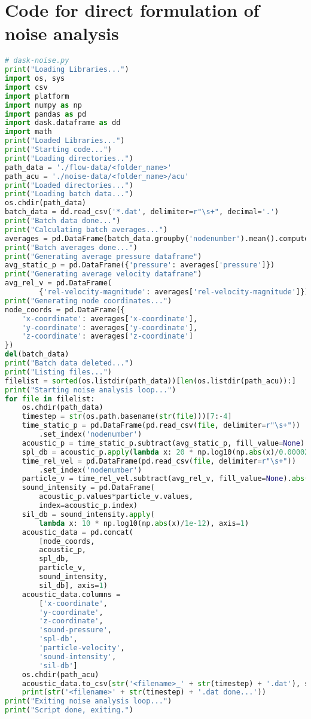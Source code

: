 \chapter{Code for direct formulation of noise analysis} %

\label{codedirect} %


\begin{lstlisting}[language=Python]
# dask-noise.py
print("Loading Libraries...")
import os, sys
import csv
import platform
import numpy as np
import pandas as pd
import dask.dataframe as dd
import math
print("Loaded Libraries...")
print("Starting code...")
print("Loading directories..")
path_data = './flow-data/<folder_name>'
path_acu = './noise-data/<folder_name>/acu'
print("Loaded directories...")
print("Loading batch data...")
os.chdir(path_data)
batch_data = dd.read_csv('*.dat', delimiter=r"\s+", decimal='.')
print("Batch data done...")
print("Calculating batch averages...")
averages = pd.DataFrame(batch_data.groupby('nodenumber').mean().compute())
print("Batch averages done...")
print("Generating average pressure dataframe")
avg_static_p = pd.DataFrame({'pressure': averages['pressure']})
print("Generating average velocity dataframe")
avg_rel_v = pd.DataFrame(
		{'rel-velocity-magnitude': averages['rel-velocity-magnitude']})
print("Generating node coordinates...")
node_coords = pd.DataFrame({
    'x-coordinate': averages['x-coordinate'],
    'y-coordinate': averages['y-coordinate'],
    'z-coordinate': averages['z-coordinate']
})
del(batch_data)
print("Batch data deleted...")
print("Listing files...")
filelist = sorted(os.listdir(path_data))[len(os.listdir(path_acu)):]
print("Starting noise analysis loop...")
for file in filelist:
    os.chdir(path_data)
    timestep = str(os.path.basename(str(file)))[7:-4]
    time_static_p = pd.DataFrame(pd.read_csv(file, delimiter=r"\s+"))
    	.set_index('nodenumber')
    acoustic_p = time_static_p.subtract(avg_static_p, fill_value=None)
    spl_db = acoustic_p.apply(lambda x: 20 * np.log10(np.abs(x)/0.00002), axis=1)
    time_rel_vel = pd.DataFrame(pd.read_csv(file, delimiter=r"\s+"))
    	.set_index('nodenumber')
    particle_v = time_rel_vel.subtract(avg_rel_v, fill_value=None).abs()
    sound_intensity = pd.DataFrame(
    	acoustic_p.values*particle_v.values,
    	index=acoustic_p.index)
    sil_db = sound_intensity.apply(
    	lambda x: 10 * np.log10(np.abs(x)/1e-12), axis=1)
    acoustic_data = pd.concat(
    	[node_coords,
    	acoustic_p,
    	spl_db,
    	particle_v,
    	sound_intensity,
    	sil_db], axis=1)
    acoustic_data.columns =
    	['x-coordinate',
    	'y-coordinate',
    	'z-coordinate',
    	'sound-pressure',
    	'spl-db',
    	'particle-velocity',
    	'sound-intensity',
    	'sil-db']
    os.chdir(path_acu)
    acoustic_data.to_csv(str('<filename>_' + str(timestep) + '.dat'), sep=',')
    print(str('<filename>' + str(timestep) + '.dat done...'))
print("Exiting noise analysis loop...")
print("Script done, exiting.")
\end{lstlisting}